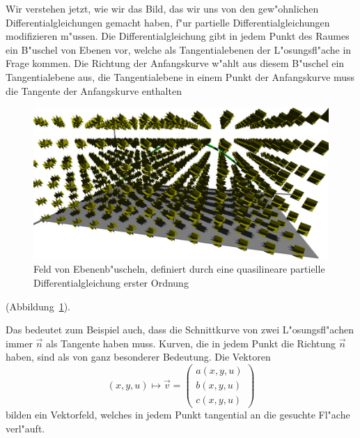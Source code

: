 Wir verstehen jetzt, wie wir das Bild, das wir uns von den gew"ohnlichen
Differentialgleichungen gemacht haben, f"ur partielle Differentialgleichungen
modifizieren m"ussen. Die Differentialgleichung gibt in jedem Punkt
des Raumes ein B"uschel von Ebenen vor, welche als Tangentialebenen der
L"osungsfl"ache in Frage kommen. Die Richtung der Anfangskurve w"ahlt aus
diesem B"uschel ein Tangentialebene aus, die Tangentialebene in einem 
Punkt der Anfangskurve muss die Tangente der Anfangskurve enthalten
\begin{figure}
\begin{center}
\includegraphics[width=\hsize]{3d/planes.jpg}
\end{center}
\caption{Feld von Ebenenb"uscheln, definiert durch eine quasilineare
partielle Differentialgleichung erster Ordnung
\label{geometrie:ebenenbueschelfeld}}
\end{figure}
(Abbildung~\ref{geometrie:ebenenbueschelfeld}).

Das bedeutet zum Beispiel auch, dass die Schnittkurve von
zwei L"osungsfl"achen immer $\vec n$ als Tangente haben muss.
Kurven, die in jedem Punkt die Richtung $\vec n$ haben, sind
als von ganz besonderer Bedeutung.
Die Vektoren
\[
(x,y,u)\mapsto
\vec v=
\begin{pmatrix}
a(x,y,u)\\b(x,y,u)\\c(x,y,u)
\end{pmatrix}
\]
bilden ein Vektorfeld, welches in jedem Punkt tangential
an die gesuchte Fl"ache verl"auft.

